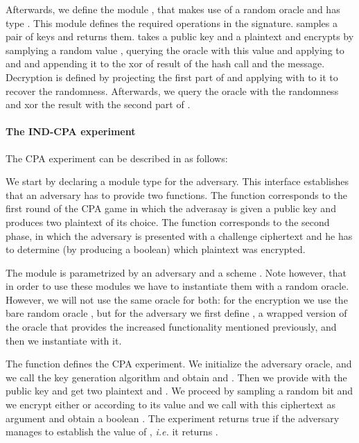 Afterwards, we define the module , that makes use of a random
oracle  and has type . This module defines the
required operations in the  signature.  samples a
pair of keys and returns them.  takes a public key  and
a plaintext  and encrypts by samplying a random value ,
querying the oracle with this value and applying  to  and
 and appending it to the xor of result of the hash call and the
message. Decryption is defined by projecting the first part of 
and applying  with  to it to recover the
randomness. Afterwards, we query the oracle with the randomness and
xor the result with the second part of .

\paragraph{The \textsf{IND-CPA} experiment}
The CPA experiment can be described in \EasyCrypt as follows:


We start by declaring a module type for the adversary. This interface
establishes that an adversary has to provide two functions. The
function  corresponds to the first round of the CPA game in
which the adverasay is given a public key  and produces two
plaintext of its choice. The function  corresponds to the
second phase, in which the adversary is presented with a challenge
ciphertext  and he has to determine (by producing a boolean)
which plaintext was encrypted.

The module  is parametrized by an adversary  and a
scheme . Note however, that in order to use these modules we
have to instantiate them with a random oracle. However, we will not
use the same oracle for both: for the encryption we use the bare
random oracle , but for the adversary we first define ,
a wrapped version of the oracle that provides the increased
functionality mentioned previously, and then we instantiate 
with it.

The function  defines the CPA experiment. We initialize the
adversary oracle, and we call the key generation algorithm and obtain
 and . Then we provide  with the public key and get
two plaintext  and . We proceed by sampling a random bit
and we encrypt either  or  according to its value and we
call  with this ciphertext as argument and obtain a boolean
. The experiment returns true if the adversary manages to
establish the value of , {\em i.e.} it returns .

